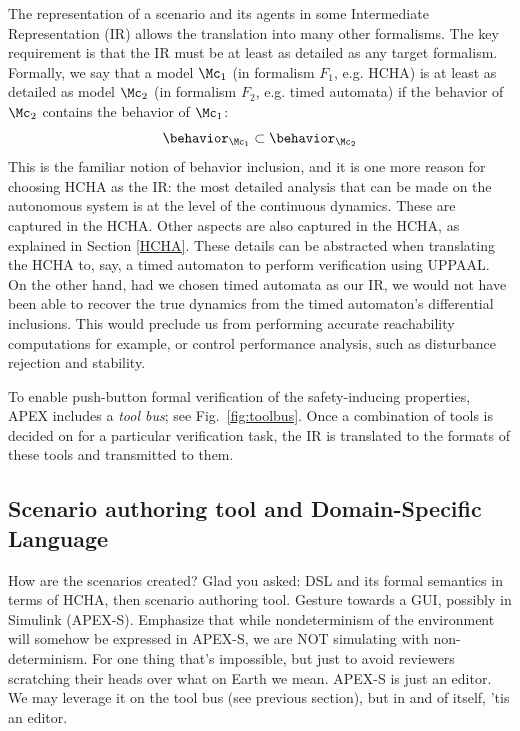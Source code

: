 The representation of a scenario and its agents in some Intermediate Representation (IR) allows the translation into many other formalisms.
The key requirement is that the IR must be at least as detailed as any target formalism.
Formally, we say that a model $\Mc_1$ (in formalism $F_1$, e.g. HCHA) is at least as detailed as model $\Mc_2$ (in formalism $F_2$, e.g. timed automata) if the behavior of $\Mc_2$ contains the behavior of $\Mc_1$: 
\[\behavior_{\Mc_1} \subset \behavior_{\Mc_2}\]
This is the familiar notion of behavior inclusion, and it is one more reason for choosing HCHA as the IR:
the most detailed analysis that can be made on the autonomous system is at the level of the continuous dynamics.
These are captured in the HCHA. 
Other aspects are also captured in the HCHA, as explained in Section \ref{HCHA}.
These details can be abstracted when translating the HCHA to, say, a timed automaton to perform verification using UPPAAL.
On the other hand, had we chosen timed automata as our IR, we would not have been able to recover the true dynamics from the timed automaton's differential inclusions. 
This would preclude us from performing accurate reachability computations for example, or control performance analysis, such as disturbance rejection and stability.


To enable push-button formal verification of the safety-inducing properties, APEX includes a \emph{tool bus}; see Fig.~\ref{fig:toolbus}.
Once a combination of tools is decided on for a particular verification task, the IR is translated to the formats of these tools and transmitted to them.

\subsection{Scenario authoring tool and Domain-Specific Language}
\label{dsl}
How are the scenarios created? 
Glad you asked: DSL and its formal semantics in terms of HCHA, then scenario authoring tool.
Gesture towards a GUI, possibly in Simulink (APEX-S). 
Emphasize that while nondeterminism of the environment will somehow be expressed in APEX-S, we are NOT simulating with non-determinism. For one thing that's impossible, but just to avoid reviewers scratching their heads over what on Earth we mean.
APEX-S is just an editor. We may leverage it on the tool bus (see previous section), but in and of itself, 'tis an editor.
